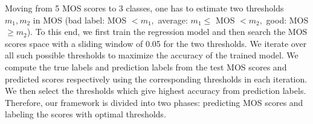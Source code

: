 Moving from 5 MOS scores to 3 classes, one has to estimate two thresholds $m_1, m_2$ in MOS (bad label: MOS  $ < m_1,$ average: $m_1 \le$ MOS $< m_2,$ good: MOS $\ge m_2$).
To this end, we first train the regression model and then search the MOS scores space with a sliding window of 0.05 for the two thresholds. 
We iterate over all such possible thresholds to maximize the accuracy of the trained model. 
We compute the true labels and prediction labels from the test MOS scores and predicted scores respectively using the corresponding thresholds in each iteration. 
We then select the thresholds which give highest accuracy from prediction labels.
Therefore, our framework is divided into two phases: predicting MOS scores and labeling the scores with optimal thresholds.

\begin{table}[t]
    \centering
    \caption{Models performance on Skype data}
    \label{class-skype}
    \vspace*{-1em}
\end{table}

